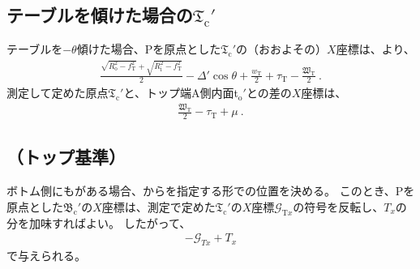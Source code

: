 \subsection[\index{テーブル}テーブルを傾けた場合の\texorpdfstring{$\mathfrak T_\mathrm c'$}{Tc'}]
           {テーブルを傾けた場合の$\boldsymbol{\mathfrak T_\mathrm c'}$}
テーブルを$-\theta$傾けた場合、\TableCenter Pを原点とした\TopOutcutCenter$\mathfrak T_\mathrm c'$の（おおよその）$X$座標は、より、
\begin{align}
  \label{eq:gaisakucenterTt}
  \frac{\sqrt{R_\mathrm o^2-f_\mathrm T^2}+\sqrt{R_\mathrm i^2-f_\mathrm T^2}}2-\Delta'\cos\theta
  +\frac{w_\mathrm T}2+\tau_\mathrm T-\frac{\mathfrak W_\mathrm T}2\ .
\end{align}
測定して定めた原点$\mathfrak T_\mathrm c'$と、トップ端A側内面t$_\mathrm o'$との差の$X$座標は、
\begin{align}
  \label{eq:gaisakucenterTr}
  \frac{\mathfrak W_\mathrm T}2-\tau_\mathrm T+\mu~.
\end{align}


\subsection{\BottomOutcutCenter（トップ基準）}
ボトム側にも\Outcut がある場合、\TopOutcutCenter から\CenterlineEndFaceDifAC を指定する形で\BottomOutcutCenter の位置を決める。
このとき、\TableCenter Pを原点とした\BottomOutcutCenter$\mathfrak B_\mathrm c'$の$X$座標は、測定で定めた$\mathfrak T_\mathrm c'$の$X$座標$\mathcal G_{\mathrm Tx}$の符号を反転し、\CenterlineEndFaceDifAC$T_x$の分を加味すればよい。
したがって、
\begin{align}
  \label{eq:TbasedTx}
  -\mathcal G_{Tx}+T_x
\end{align}
で与えられる。



